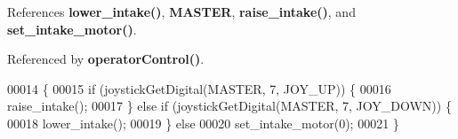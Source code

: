 References \textbf{ lower\+\_\+intake()}, \textbf{ M\+A\+S\+T\+ER}, \textbf{ raise\+\_\+intake()}, and \textbf{ set\+\_\+intake\+\_\+motor()}.



Referenced by \textbf{ operator\+Control()}.


\begin{DoxyCode}
00014                      \{
00015   \textcolor{keywordflow}{if} (joystickGetDigital(MASTER, 7, JOY\_UP)) \{
00016     raise_intake();
00017   \} \textcolor{keywordflow}{else} \textcolor{keywordflow}{if} (joystickGetDigital(MASTER, 7, JOY\_DOWN)) \{
00018     lower_intake();
00019   \} \textcolor{keywordflow}{else}
00020     set_intake_motor(0);
00021 \}
\end{DoxyCode}
